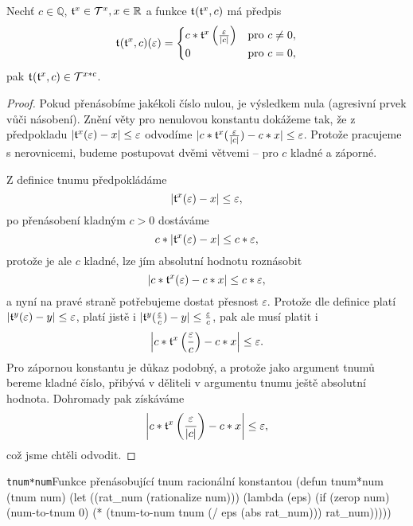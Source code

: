 \begin{theorem}
Nechť $c\in\mathbb{Q}$, $\mathfrak{t}^{x}\in\mathcal{T}^{x},x\in\mathbb{R}$ a funkce $\mathfrak{t}^{}(\mathfrak{t}^{x},c)$ má předpis
\begin{equation}
\mathfrak{t}^{}(\mathfrak{t}^{x},c)(\varepsilon)=\begin{cases}c*\mathfrak{t}^{x}\left(\frac{\varepsilon}{|c|}\right) & \text{pro~}c\neq{0},\\0&\text{pro~}c={0},\end{cases}
\end{equation}
pak $\mathfrak{t}^{}(\mathfrak{t}^{x},c)\in\mathcal{T}^{x*c}$.
\begin{proof}
Pokud přenásobíme jakékoli číslo nulou, je výsledkem nula (agresivní prvek vůči násobení). Znění věty pro nenulovou konstantu dokážeme tak, že z předpokladu $|\mathfrak{t}^{x}(\varepsilon) -x|\leq\varepsilon$ odvodíme $|c*\mathfrak{t}^{x}(\frac{\varepsilon}{|c|})-c*x|\leq\varepsilon$. Protože pracujeme s nerovnicemi, budeme postupovat dvěmi větvemi -- pro $c$ kladné a záporné.

Z definice tnumu předpokládáme
\begin{equation}
|\mathfrak{t}^{x}(\varepsilon)-x|\leq\varepsilon,
\end{equation}
po přenásobení kladným $c>0$ dostáváme
\begin{equation}
c*|\mathfrak{t}^{x}(\varepsilon)-x|\leq c*\varepsilon,
\end{equation}
protože je ale $c$ kladné, lze jím absolutní hodnotu roznásobit
\begin{equation}
|c*\mathfrak{t}^{x}(\varepsilon)-c*x|\leq c*\varepsilon,
\end{equation}
a nyní na pravé straně potřebujeme dostat přesnost $\varepsilon$. Protože dle definice platí $|\mathfrak{t}^{y}(\varepsilon)-y|\leq\varepsilon$, platí jistě i $|\mathfrak{t}^{y}(\frac{\varepsilon}{c})-y|\leq\frac{\varepsilon}{c}$, pak ale musí platit i
\begin{equation}
\left|c*\mathfrak{t}^{x}\left(\frac{\varepsilon}{c}\right)-c*x\right|\leq \varepsilon.
\end{equation}
Pro zápornou konstantu je důkaz podobný, a protože jako argument tnumů bereme kladné číslo, přibývá v děliteli v argumentu tnumu ještě absolutní hodnota. Dohromady pak získáváme
\begin{equation}
\left|c*\mathfrak{t}^{x}\left(\frac{\varepsilon}{|c|}\right)-c*x\right|\leq\varepsilon,
\end{equation}
což jsme chtěli odvodit.
\end{proof}
\end{theorem}

\begin{lispcode}{\texttt{tnum*num}}{Funkce přenásobující tnum racionální konstantou}
(\textcolor{funkcionalni}{defun} \textcolor{pojmenovan}{tnum*num} (tnum num)
  (\textcolor{vedlejsi}{let} ((rat_num (\textcolor{matematicke}{rationalize} num)))
    (\textcolor{funkcionalni}{lambda} (eps)
      (\textcolor{funkcionalni}{if} (\textcolor{funkcionalni}{zerop} num)
          (\textcolor{moje}{num-to-tnum} 0)
        (\textcolor{matematicke}{*} (\textcolor{moje}{tnum-to-num} tnum (\textcolor{matematicke}{/} eps (\textcolor{matematicke}{abs} rat_num))) rat_num))))) 
\end{lispcode}

